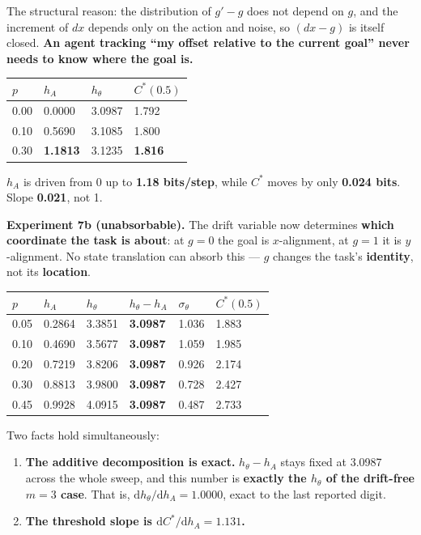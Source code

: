 \documentclass[11pt]{article}
\providecommand{\tightlist}{%
  \setlength{\itemsep}{0pt}\setlength{\parskip}{0pt}}
\begin{document}
The structural reason: the distribution of \(g'-g\) does not depend on \(g\), and the increment of \(dx\) depends only on the action and noise, so \((dx-g)\) is itself closed. \textbf{An agent tracking ``my offset relative to the current goal'' never needs to know where the goal is.}

\begin{longtable}[]{@{}llll@{}}
\toprule
\(p\) & \(h_A\) & \(h_\theta\) & \(C^*(0.5)\)\tabularnewline
\midrule
\endhead
0.00 & 0.0000 & 3.0987 & 1.792\tabularnewline
0.10 & 0.5690 & 3.1085 & 1.800\tabularnewline
0.30 & \textbf{1.1813} & 3.1235 & \textbf{1.816}\tabularnewline
\bottomrule
\end{longtable}

\(h_A\) is driven from 0 up to \textbf{1.18 bits/step}, while \(C^*\) moves by only \textbf{0.024 bits}. Slope \textbf{0.021}, not 1.

\textbf{Experiment 7b (unabsorbable).} The drift variable now determines \textbf{which coordinate the task is about}: at \(g=0\) the goal is \(x\)-alignment, at \(g=1\) it is \(y\)-alignment. No state translation can absorb this --- \(g\) changes the task's \textbf{identity}, not its \textbf{location}.

\begin{longtable}[]{@{}llllll@{}}
\toprule
\(p\) & \(h_A\) & \(h_\theta\) & \(h_\theta-h_A\) & \(\sigma_\theta\) & \(C^*(0.5)\)\tabularnewline
\midrule
\endhead
0.05 & 0.2864 & 3.3851 & \textbf{3.0987} & 1.036 & 1.883\tabularnewline
0.10 & 0.4690 & 3.5677 & \textbf{3.0987} & 1.059 & 1.985\tabularnewline
0.20 & 0.7219 & 3.8206 & \textbf{3.0987} & 0.926 & 2.174\tabularnewline
0.30 & 0.8813 & 3.9800 & \textbf{3.0987} & 0.728 & 2.427\tabularnewline
0.45 & 0.9928 & 4.0915 & \textbf{3.0987} & 0.487 & 2.733\tabularnewline
\bottomrule
\end{longtable}

Two facts hold simultaneously:

\begin{enumerate}
\def\labelenumi{\arabic{enumi}.}
\tightlist
\item
  \textbf{The additive decomposition is exact.} \(h_\theta-h_A\) stays fixed at 3.0987 across the whole sweep, and this number is \textbf{exactly the \(h_\theta\) of the drift-free \(m=3\) case}. That is, \(\mathrm{d}h_\theta/\mathrm{d}h_A=\mathbf{1.0000}\), exact to the last reported digit.
\item
  \textbf{The threshold slope is \(\mathrm{d}C^*/\mathrm{d}h_A=1.131\).}
\end{enumerate}
\end{document}
